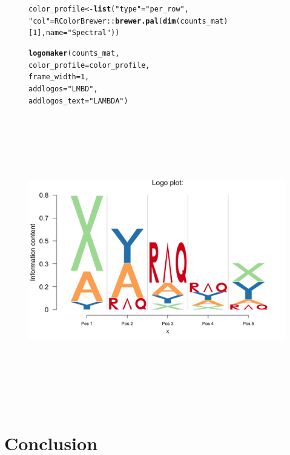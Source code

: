 \documentclass[12pt]{article}\usepackage[]{graphicx}\usepackage[usenames,dvipsnames]{color}
\makeatletter
\newcommand{\hlnum}[1]{\textcolor[rgb]{0.686,0.059,0.569}{#1}}%
\newcommand{\hlstr}[1]{\textcolor[rgb]{0.192,0.494,0.8}{#1}}%
\newcommand{\hlopt}[1]{\textcolor[rgb]{0,0,0}{#1}}%
\newcommand{\hlstd}[1]{\textcolor[rgb]{0.345,0.345,0.345}{#1}}%
\newcommand{\hlkwb}[1]{\textcolor[rgb]{0.69,0.353,0.396}{#1}}%
\newcommand{\hlkwc}[1]{\textcolor[rgb]{0.333,0.667,0.333}{#1}}%
\newcommand{\hlkwd}[1]{\textcolor[rgb]{0.737,0.353,0.396}{\textbf{#1}}}%
\newenvironment{kframe}{%
 \def\at@end@of@kframe{}%
 \ifinner\ifhmode%
  \def\at@end@of@kframe{\end{minipage}}%
  \begin{minipage}{\columnwidth}%
 \fi\fi%
 \def\FrameCommand##1{\hskip\@totalleftmargin \hskip-\fboxsep
 \colorbox{shadecolor}{##1}\hskip-\fboxsep
     \hskip-\linewidth \hskip-\@totalleftmargin \hskip\columnwidth}%
 \MakeFramed {\advance\hsize-\width
   \@totalleftmargin\z@ \linewidth\hsize
   \@setminipage}}%
 {\par\unskip\endMakeFramed%
 \at@end@of@kframe}
\newenvironment{knitrout}{}{} %
\makeatother
\begin{document}
\begin{figure}[h]
\begin{center}
\begin{knitrout}
\color{fgcolor}\begin{kframe}
\begin{alltt}
\hlstd{color_profile} \hlkwb{<-} \hlkwd{list}\hlstd{(}\hlstr{"type"} \hlstd{=} \hlstr{"per_row"}\hlstd{,}
                      \hlstr{"col"} \hlstd{= RColorBrewer}\hlopt{::}\hlkwd{brewer.pal}\hlstd{(}\hlkwd{dim}\hlstd{(counts_mat)[}\hlnum{1}\hlstd{],} \hlkwc{name} \hlstd{=} \hlstr{"Spectral"}\hlstd{))}

\hlkwd{logomaker}\hlstd{(counts_mat,}
          \hlkwc{color_profile} \hlstd{= color_profile,}
          \hlkwc{frame_width} \hlstd{=} \hlnum{1}\hlstd{,}
          \hlkwc{addlogos}\hlstd{=}\hlstr{"LMBD"}\hlstd{,}
          \hlkwc{addlogos_text}\hlstd{=}\hlstr{"LAMBDA"}\hlstd{)}
\end{alltt}
\end{kframe}
\includegraphics[width=8in,height=5in]{figure/logolas_use_17-1} 

\end{knitrout}
\end{center}
\end{figure}

\newpage

\section{Conclusion}
\end{document}

